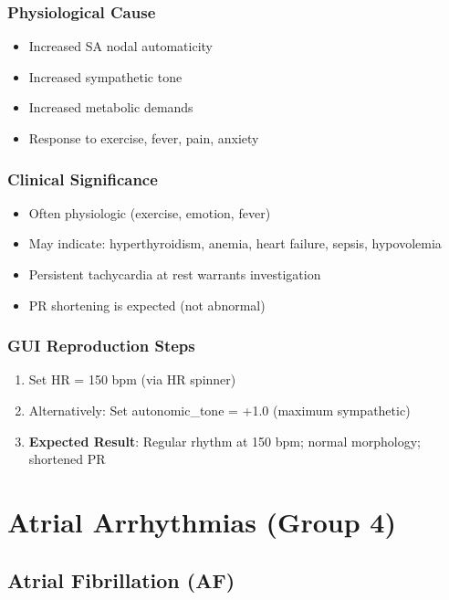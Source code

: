 \documentclass[11pt, a4paper]{article}
\begin{document}
\subsubsection{Physiological Cause}
\begin{itemize}
    \item Increased SA nodal automaticity
    \item Increased sympathetic tone
    \item Increased metabolic demands
    \item Response to exercise, fever, pain, anxiety
\end{itemize}

\subsubsection{Clinical Significance}
\begin{itemize}
    \item Often physiologic (exercise, emotion, fever)
    \item May indicate: hyperthyroidism, anemia, heart failure, sepsis, hypovolemia
    \item Persistent tachycardia at rest warrants investigation
    \item PR shortening is expected (not abnormal)
\end{itemize}

\subsubsection{GUI Reproduction Steps}
\begin{enumerate}
    \item Set HR = 150 bpm (via HR spinner)
    \item Alternatively: Set autonomic\_tone = +1.0 (maximum sympathetic)
    \item \textbf{Expected Result}: Regular rhythm at 150 bpm; normal morphology; shortened PR
\end{enumerate}

\section{Atrial Arrhythmias (Group 4)}

\subsection{Atrial Fibrillation (AF)}
\end{document}
